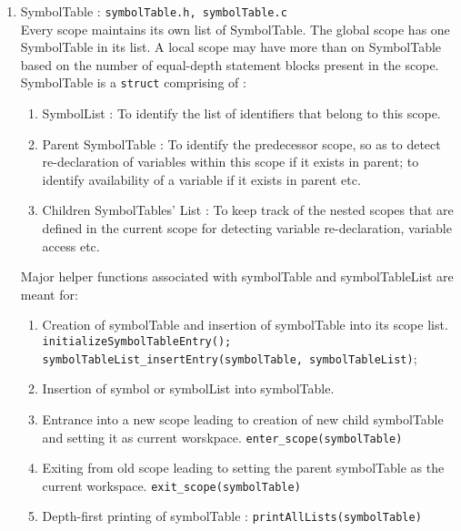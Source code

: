 \documentclass[12pt]{article}
\begin{document}
\begin{enumerate}
\item SymbolTable : \texttt{symbolTable.h, symbolTable.c}
\\ Every scope maintains its own list of SymbolTable. The global scope has one SymbolTable in its list. A local scope may have more than on SymbolTable based on the number of equal-depth statement blocks present in the scope. SymbolTable is a \texttt{struct} comprising of :
\begin{enumerate}
\item SymbolList : To identify the list of identifiers that belong to this scope.
\item Parent SymbolTable : To identify the predecessor scope, so as to detect re-declaration of variables within this scope if it exists in parent; to identify availability of a variable if it exists in parent etc.
\item Children SymbolTables' List : To keep track of the nested scopes that are defined in the current scope for detecting variable re-declaration, variable access etc.
\end{enumerate}
Major helper functions associated with symbolTable and symbolTableList are meant for:
\begin{enumerate}
\item Creation of symbolTable and insertion of symbolTable into its scope list.
\\\texttt{initializeSymbolTableEntry(); 
\\symbolTableList\_insertEntry(symbolTable, symbolTableList)};
\item Insertion of symbol or symbolList into symbolTable.
\item Entrance into a new scope leading to creation of new child symbolTable and setting it as current worskpace. 
\texttt{enter\_scope(symbolTable)}
\item Exiting from old scope leading to setting the parent symbolTable as the current workspace.
\texttt{exit\_scope(symbolTable)}
\item Depth-first printing of symbolTable : \texttt{printAllLists(symbolTable)}
\end{enumerate}
\end{enumerate}
\end{document}
